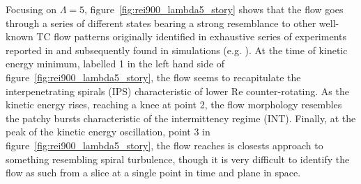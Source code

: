 \documentclass[openacc]{rstransa}%
\newcommand{\Reyn}{\mathrm{Re}}
\begin{document}
Focusing on $\Lambda=5$, figure~\ref{fig:rei900_lambda5_story} shows that the flow goes through a series of different states bearing a strong resemblance to other well-known TC flow patterns originally identified in exhaustive series of experiments reported in \cite{1984JFM...146...45M} and subsequently found in simulations (e.g. \cite{2009PhRvE..80d6315M}). At the time of kinetic energy minimum, labelled 1 in the left hand side of figure~\ref{fig:rei900_lambda5_story}, the flow seems to recapitulate the interpenetrating spirals (IPS) characteristic of lower $\Reyn$ counter-rotating. As the kinetic energy rises, reaching a knee at point 2, the flow morphology resembles the patchy bursts characteristic of the intermittency regime (INT). Finally, at the peak of the kinetic energy oscillation, point 3 in figure~\ref{fig:rei900_lambda5_story}, the flow reaches is closests approach to something resembling spiral turbulence, though it is very difficult to identify the flow as such from a slice at a single point in time and plane in space.
\end{document}
